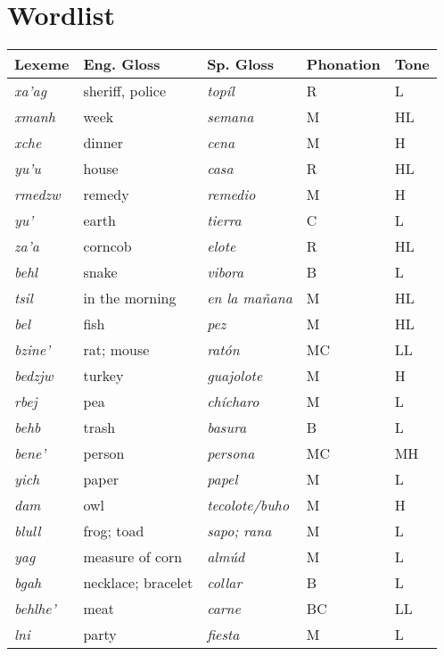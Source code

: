 \chapter{Wordlist}

\begin{longtable}{lllll}
\lsptoprule
 Lexeme & Eng. Gloss & Sp. Gloss & Phonation   & Tone   \\
\midrule
 \textit{xa'ag}  & sheriff, police    & \textit{topíl} & R & L \\
 \textit{xmanh}  & week  & \textit{semana}    & M & HL \\
 \textit{xche}   & dinner & \textit{cena} & M & H \\
 \textit{yu'u}   & house & \textit{casa}  & R & HL    \\
 \textit{rmedzw} & remedy    & \textit{remedio}   & M & H \\
 \textit{yu'}    & earth & \textit{tierra}    & C & L \\
 \textit{za'a}   & corncob   & \textit{elote} & R & HL \\
 \textit{behl}   & snake & \textit{vibora}    & B & L \\
 \textit{tsil}   & in the morning    & \textit{en la mañana} & M & HL \\
 \textit{bel}    & fish & \textit{pez} & M & HL \\
 \textit{bzine'} & rat; mouse & \textit{ratón} & MC & LL \\
 \textit{bedzjw} & turkey    & \textit{guajolote} & M & H \\
 \textit{rbej}   & pea   & \textit{chícharo}  & M & L \\
 \textit{behb}   & trash & \textit{basura}    & B & L \\
 \textit{bene'}  & person & \textit{persona} & MC & MH \\
 \textit{yich}   & paper & \textit{papel} & M & L \\
 \textit{dam}    & owl & \textit{tecolote/buho} & M & H \\
 \textit{blull}  & frog; toad & \textit{sapo; rana} & M & L \\
 \textit{yag}    & measure of corn   & \textit{almúd} & M & L \\
 \textit{bgah}   & necklace; bracelet & \textit{collar} & B & L \\
 \textit{behlhe'} & meat & \textit{carne} & BC & LL \\
 \textit{lni}    & party & \textit{fiesta} & M & L \\

\end{longtable}
